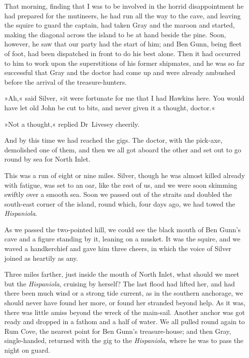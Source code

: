 That morning, finding that I was to be involved in the horrid disappointment he had prepared for the mutineers, he had run all the way to the cave, and leaving the squire to guard the captain, had taken Gray and the maroon and started, making the diagonal across the island to be at hand beside the pine. Soon, however, he saw that our party had the start of him; and Ben Gunn, being fleet of foot, had been dispatched in front to do his best alone. Then it had occurred to him to work upon the superstitions of his former shipmates, and he was so far successful that Gray and the doctor had come up and were already ambushed before the arrival of the treasure-hunters.

»Ah,« said Silver, »it were fortunate for me that I had Hawkins here. You would have let old John be cut to bits, and never given it a thought, doctor.«

»Not a thought,« replied Dr~Livesey cheerily.

And by this time we had reached the gigs. The doctor, with the pick-axe, demolished one of them, and then we all got aboard the other and set out to go round by sea for North Inlet.

This was a run of eight or nine miles. Silver, though he was almost killed already with fatigue, was set to an oar, like the rest of us, and we were soon skimming swiftly over a smooth sea. Soon we passed out of the straits and doubled the south-east corner of the island, round which, four days ago, we had towed the \textit{Hispaniola}.

As we passed the two-pointed hill, we could see the black mouth of Ben Gunn's cave and a figure standing by it, leaning on a musket. It was the squire, and we waved a handkerchief and gave him three cheers, in which the voice of Silver joined as heartily as any.

Three miles farther, just inside the mouth of North Inlet, what should we meet but the \textit{Hispaniola}, cruising by herself? The last flood had lifted her, and had there been much wind or a strong tide current, as in the southern anchorage, we should never have found her more, or found her stranded beyond help. As it was, there was little amiss beyond the wreck of the main-sail. Another anchor was got ready and dropped in a fathom and a half of water. We all pulled round again to Rum Cove, the nearest point for Ben Gunn's treasure-house; and then Gray, single-handed, returned with the gig to the \textit{Hispaniola}, where he was to pass the night on guard.

